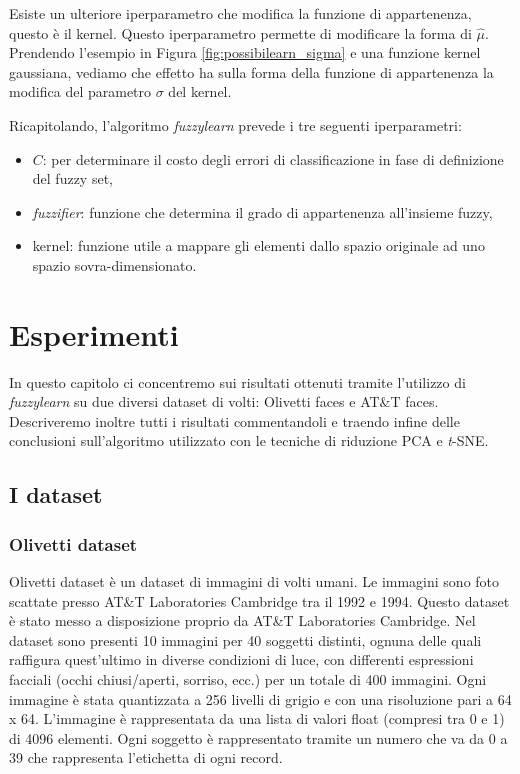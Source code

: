 \documentclass[12pt,italian]{report}
\begin{document}
Esiste un ulteriore iperparametro che modifica la funzione di appartenenza, questo è il kernel. Questo iperparametro permette di modificare la forma di $\hat \mu$. Prendendo l'esempio in Figura \ref{fig:possibilearn_sigma} e una funzione kernel gaussiana, vediamo che effetto ha sulla forma della funzione di appartenenza la modifica del parametro $ \sigma $ del kernel.

Ricapitolando, l'algoritmo \emph{fuzzylearn} prevede i tre seguenti iperparametri:
\begin{itemize}
	\item $C$: per determinare il costo degli errori di classificazione in fase di definizione del fuzzy set,
	\item \emph{fuzzifier}: funzione che determina il grado di appartenenza all'insieme fuzzy,
	\item kernel: funzione utile a mappare gli elementi dallo spazio originale ad uno spazio sovra-dimensionato.
\end{itemize}

\chapter{Esperimenti}

In questo capitolo ci concentremo sui risultati ottenuti tramite l'utilizzo di \emph{fuzzylearn} su due diversi dataset di volti: Olivetti faces e AT\&T faces. Descriveremo inoltre tutti i risultati commentandoli e traendo infine delle conclusioni sull'algoritmo utilizzato con le tecniche di riduzione PCA e \emph{t}-SNE.

\section{I dataset}
\subsection{Olivetti dataset}
Olivetti dataset è un dataset di immagini di volti umani. Le immagini sono foto scattate presso AT\&T Laboratories Cambridge tra il 1992 e 1994. Questo dataset è stato messo a disposizione proprio da AT\&T Laboratories Cambridge.
Nel dataset sono presenti 10 immagini per 40 soggetti distinti, ognuna delle quali raffigura quest'ultimo in diverse condizioni di luce, con differenti espressioni facciali (occhi chiusi/aperti, sorriso, ecc.) per un totale di 400 immagini. Ogni immagine è stata quantizzata a 256 livelli di grigio e con una risoluzione pari a 64 x 64. L'immagine è rappresentata da una lista di valori float (compresi tra 0 e 1) di 4096 elementi. Ogni soggetto è rappresentato tramite un numero che va da 0 a 39 che rappresenta l'etichetta di ogni record.
\end{document}
